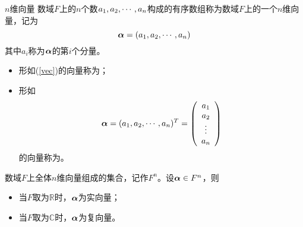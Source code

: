 \begin{frame}
  \begin{footnotesize}
    \begin{block}{$n$维向量}
      数域$F$上的$n$个数$a_1,a_2,\cdots,a_n$构成的有序数组称为数域$F$上的一个$n$维向量，记为
      \begin{equation}\label{vec}
        \boldsymbol{\alpha} = (a_1, a_2, \cdots, a_n)
      \end{equation}
      其中$a_i$称为$\boldsymbol{\alpha}$的第$i$个分量。
    \end{block}
    \pause
    
    \begin{itemize}
    \item 形如(\ref{vec})的向量称为；\\[0.1in]
    \item 形如
      $$
      \boldsymbol{\alpha} = (a_1, a_2, \cdots, a_n)^T = \left(
      \begin{array}{c}
        a_1\\
        a_2\\
        \vdots\\
        a_n
      \end{array}
      \right)
      $$
      的向量称为。
    \end{itemize}

    \pause
    数域$F$上全体$n$维向量组成的集合，记作$F^n$。\pause 设$\boldsymbol{\alpha}\in F^n$，则
    \begin{itemize}
    \item 当$F$取为$\mathbb R$时，$\boldsymbol{\alpha}$为实向量；
    \item 当$F$取为$\mathbb C$时，$\boldsymbol{\alpha}$为复向量。
    \end{itemize}
  \end{footnotesize}
\end{frame}


